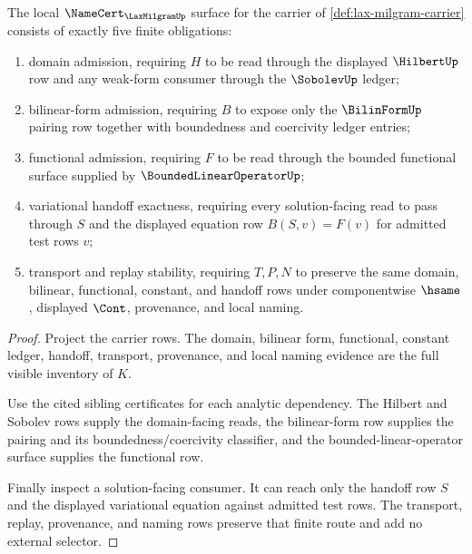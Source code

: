 \begin{theorem}
\label{thm:lax-milgram-namecert-obligations}
The local $\NameCert_{\LaxMilgramUp}$ surface for the carrier of \autoref{def:lax-milgram-carrier} consists of exactly five finite obligations:
\begin{enumerate}
\item domain admission, requiring $H$ to be read through the displayed $\HilbertUp$ row and any weak-form consumer through the $\SobolevUp$ ledger;
\item bilinear-form admission, requiring $B$ to expose only the $\BilinFormUp$ pairing row together with boundedness and coercivity ledger entries;
\item functional admission, requiring $F$ to be read through the bounded functional surface supplied by $\BoundedLinearOperatorUp$;
\item variational handoff exactness, requiring every solution-facing read to pass through $S$ and the displayed equation row $B(S,v)=F(v)$ for admitted test rows $v$;
\item transport and replay stability, requiring $T,P,N$ to preserve the same domain, bilinear, functional, constant, and handoff rows under componentwise $\hsame$, displayed $\Cont$, provenance, and local naming.
\end{enumerate}
\end{theorem}
\begin{proof}
Project the carrier rows. The domain, bilinear form, functional, constant ledger, handoff, transport, provenance, and local naming evidence are the full visible inventory of $K$.

Use the cited sibling certificates for each analytic dependency. The Hilbert and Sobolev rows supply the domain-facing reads, the bilinear-form row supplies the pairing and its boundedness/coercivity classifier, and the bounded-linear-operator surface supplies the functional row.

Finally inspect a solution-facing consumer. It can reach only the handoff row $S$ and the displayed variational equation against admitted test rows. The transport, replay, provenance, and naming rows preserve that finite route and add no external selector.
\end{proof}

